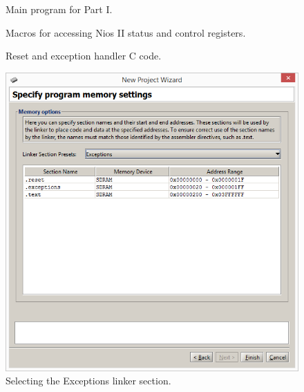 \documentclass[epsfig,10pt,fullpage]{article}
\begin{document}
\begin{figure}[H]
\begin{center}

\end{center}
\caption{Main program for Part I.}
\label{fig:code}
\end{figure}

\newpage
\begin{figure}[h!]
\begin{center}

\end{center}
	\vspace{-0.5cm}\caption{Macros for accessing Nios II status and control registers.}
   \label{fig:macros}
\end{figure}

\newpage



\begin{figure}[H]
\begin{center}

\end{center}
\vspace{-0.5cm}\caption{Reset and exception handler C code.}
\label{fig:irq_code}
\end{figure}

\begin{figure}[H]
	\begin{center}
	\includegraphics[scale=0.58]{figures/exceptions.png}
	\end{center}
	\vspace{-0.25cm}\caption{Selecting the {\sf Exceptions} linker section.}
\label{fig:exceptions}
\end{figure}
\end{document}

